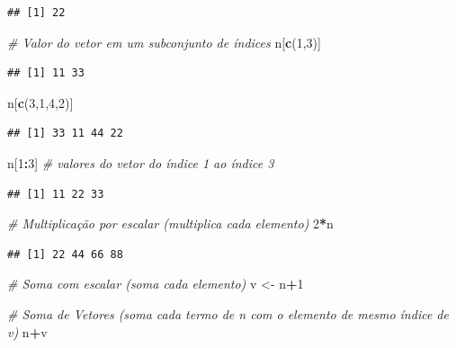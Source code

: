 \documentclass[
]{book}
\newenvironment{Shaded}{\begin{snugshade}}{\end{snugshade}}
\newcommand{\CommentTok}[1]{\textcolor[rgb]{0.56,0.35,0.01}{\textit{#1}}}
\newcommand{\DecValTok}[1]{\textcolor[rgb]{0.00,0.00,0.81}{#1}}
\newcommand{\FunctionTok}[1]{\textcolor[rgb]{0.13,0.29,0.53}{\textbf{#1}}}
\newcommand{\NormalTok}[1]{#1}
\newcommand{\OtherTok}[1]{\textcolor[rgb]{0.56,0.35,0.01}{#1}}
\newcommand{\SpecialCharTok}[1]{\textcolor[rgb]{0.81,0.36,0.00}{\textbf{#1}}}
\begin{document}
\begin{verbatim}
## [1] 22
\end{verbatim}

\begin{Shaded}
\begin{Highlighting}[]
\CommentTok{\# Valor do vetor em um subconjunto de índices}
\NormalTok{n[}\FunctionTok{c}\NormalTok{(}\DecValTok{1}\NormalTok{,}\DecValTok{3}\NormalTok{)]}
\end{Highlighting}
\end{Shaded}

\begin{verbatim}
## [1] 11 33
\end{verbatim}

\begin{Shaded}
\begin{Highlighting}[]
\NormalTok{n[}\FunctionTok{c}\NormalTok{(}\DecValTok{3}\NormalTok{,}\DecValTok{1}\NormalTok{,}\DecValTok{4}\NormalTok{,}\DecValTok{2}\NormalTok{)]}
\end{Highlighting}
\end{Shaded}

\begin{verbatim}
## [1] 33 11 44 22
\end{verbatim}

\begin{Shaded}
\begin{Highlighting}[]
\NormalTok{n[}\DecValTok{1}\SpecialCharTok{:}\DecValTok{3}\NormalTok{] }\CommentTok{\# valores do vetor do índice 1 ao índice 3}
\end{Highlighting}
\end{Shaded}

\begin{verbatim}
## [1] 11 22 33
\end{verbatim}

\begin{Shaded}
\begin{Highlighting}[]
\CommentTok{\# Multiplicação por escalar (multiplica cada elemento)}
\DecValTok{2}\SpecialCharTok{*}\NormalTok{n}
\end{Highlighting}
\end{Shaded}

\begin{verbatim}
## [1] 22 44 66 88
\end{verbatim}

\begin{Shaded}
\begin{Highlighting}[]
\CommentTok{\# Soma com escalar (soma cada elemento)}
\NormalTok{v }\OtherTok{\textless{}{-}}\NormalTok{ n}\SpecialCharTok{+}\DecValTok{1}

\CommentTok{\# Soma de Vetores (soma cada termo de n com o elemento de mesmo índice de v)}
\NormalTok{n}\SpecialCharTok{+}\NormalTok{v}
\end{Highlighting}
\end{Shaded}
\end{document}
